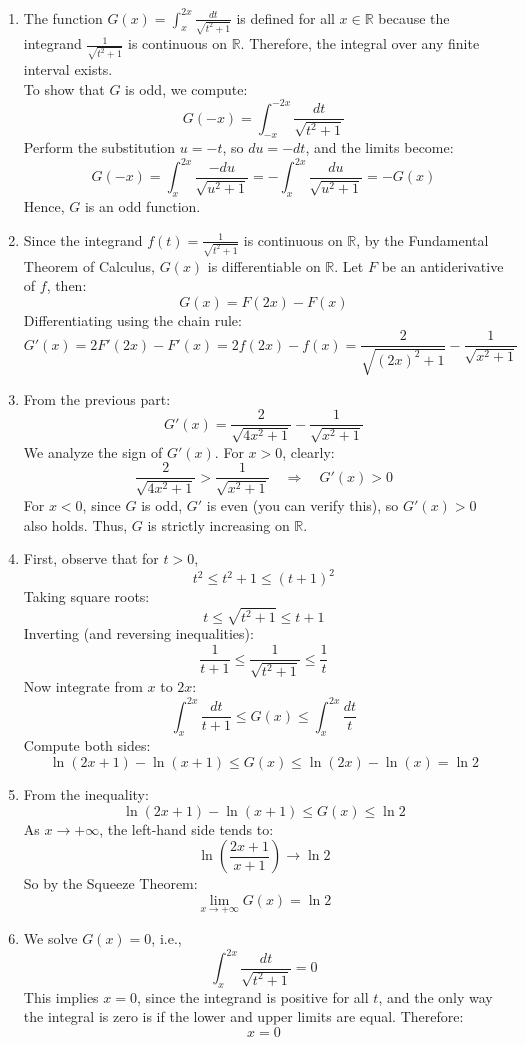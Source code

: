 \documentclass[12pt]{article}
\begin{document}
\begin{answerbox}
  \begin{enumerate}
    \item The function $ G(x) = \int_{x}^{2x} \frac{dt}{\sqrt{t^2 + 1}} $ is defined for all $ x \in \mathbb{R} $ because the integrand $ \frac{1}{\sqrt{t^2 + 1}} $ is continuous on $ \mathbb{R} $. Therefore, the integral over any finite interval exists. \\
    To show that $ G $ is odd, we compute:
    $$
    G(-x) = \int_{-x}^{-2x} \frac{dt}{\sqrt{t^2 + 1}}
    $$
    Perform the substitution $ u = -t $, so $ du = -dt $, and the limits become:
    $$
    G(-x) = \int_{x}^{2x} \frac{-du}{\sqrt{u^2 + 1}} = -\int_{x}^{2x} \frac{du}{\sqrt{u^2 + 1}} = -G(x)
    $$
    Hence, $ G $ is an odd function.

    \item Since the integrand $ f(t) = \frac{1}{\sqrt{t^2 + 1}} $ is continuous on $ \mathbb{R} $, by the Fundamental Theorem of Calculus, $ G(x) $ is differentiable on $ \mathbb{R} $. Let $ F $ be an antiderivative of $ f $, then:
    $$
    G(x) = F(2x) - F(x)
    $$
    Differentiating using the chain rule:
    $$
    G'(x) = 2F'(2x) - F'(x) = 2f(2x) - f(x) = \frac{2}{\sqrt{(2x)^2 + 1}} - \frac{1}{\sqrt{x^2 + 1}}
    $$

    \item From the previous part:
    $$
    G'(x) = \frac{2}{\sqrt{4x^2 + 1}} - \frac{1}{\sqrt{x^2 + 1}}
    $$
    We analyze the sign of $ G'(x) $. For $ x > 0 $, clearly:
    $$
    \frac{2}{\sqrt{4x^2 + 1}} > \frac{1}{\sqrt{x^2 + 1}} \quad \Rightarrow \quad G'(x) > 0
    $$
    For $ x < 0 $, since $ G $ is odd, $ G' $ is even (you can verify this), so $ G'(x) > 0 $ also holds. Thus, $ G $ is strictly increasing on $ \mathbb{R} $.

    \item First, observe that for $ t > 0 $,
    $$
    t^2 \leq t^2 + 1 \leq (t + 1)^2
    $$
    Taking square roots:
    $$
    t \leq \sqrt{t^2 + 1} \leq t + 1
    $$
    Inverting (and reversing inequalities):
    $$
    \frac{1}{t + 1} \leq \frac{1}{\sqrt{t^2 + 1}} \leq \frac{1}{t}
    $$
    Now integrate from $ x $ to $ 2x $:
    $$
    \int_x^{2x} \frac{dt}{t + 1} \leq G(x) \leq \int_x^{2x} \frac{dt}{t}
    $$
    Compute both sides:
    $$
    \ln(2x + 1) - \ln(x + 1) \leq G(x) \leq \ln(2x) - \ln(x) = \ln 2
    $$

    \item From the inequality:
    $$
    \ln(2x + 1) - \ln(x + 1) \leq G(x) \leq \ln 2
    $$
    As $ x \to +\infty $, the left-hand side tends to:
    $$
    \ln\left(\frac{2x + 1}{x + 1}\right) \to \ln 2
    $$
    So by the Squeeze Theorem:
    $$
    \lim_{x \to +\infty} G(x) = \ln 2
    $$

    \item We solve $ G(x) = 0 $, i.e.,
    $$
    \int_x^{2x} \frac{dt}{\sqrt{t^2 + 1}} = 0
    $$
    This implies $ x = 0 $, since the integrand is positive for all $ t $, and the only way the integral is zero is if the lower and upper limits are equal. Therefore:
    $$
    x = 0
    $$
\end{enumerate}
\end{answerbox}
\end{document}
